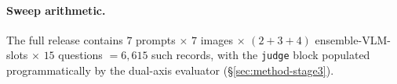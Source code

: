 \paragraph{Sweep arithmetic.}
The full release contains $7$ prompts $\times$ $7$ images $\times$
$(2 + 3 + 4)$ ensemble-VLM-slots $\times$ $15$ questions $= 6{,}615$ such
records, with the \texttt{judge} block populated programmatically by the
dual-axis evaluator (\S\ref{sec:method-stage3}).
